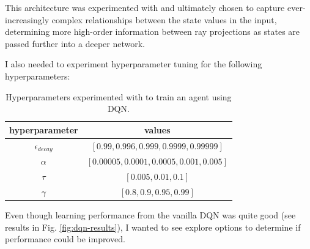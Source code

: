 \documentclass[11pt]{article}
\begin{document}
 \FloatBarrier
 
  This architecture was experimented with and ultimately chosen to capture ever-increasingly complex relationships between the state values in the input, determining more high-order information between ray projections as states are passed further into a deeper network.

I also needed to experiment hyperparameter tuning for the following hyperparameters:

\FloatBarrier

\begin{table}[!ht]
	\centering
	\begin{tabular}{ c | c }
	\textbf{hyperparameter} & \textbf{values} \\
	\hline
	$\epsilon_{decay}$ & $[0.99, 0.996, 0.999, 0.9999, 0.99999]$ \\
	$\alpha$ & $[0.00005, 0.0001, 0.0005, 0.001, 0.005]$ \\
	$\tau$ & $[0.005, 0.01, 0.1]$ \\
	$\gamma$ & $[0.8, 0.9, 0.95, 0.99]$ \\
	\hline
	\end{tabular}
	\caption{Hyperparameters experimented with to train an agent using DQN.}
	\label{tbl:parameters}
\end{table}

\FloatBarrier

Even though learning performance from the vanilla DQN was quite good (see results in
Fig. \ref{fig:dqn-results}), I wanted to see explore options to determine if
performance could be improved.
%
%
%
%
%
\end{document}
